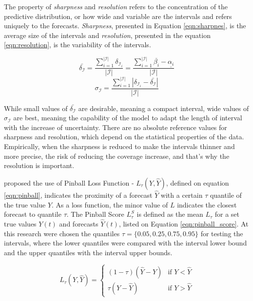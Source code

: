 The property of \textit{sharpness} and \textit{resolution} refers to the concentration of the predictive distribution, or how wide and variable are the intervals and refers uniquely to the forecasts. \textit{Sharpness}, presented in Equation \eqref{eqn:sharpnes}, is the average size of the intervals and \textit{resolution}, presented in the equation \eqref{eqn:resolution}, is the variability of the intervals.   

\begin{equation}
\bar{\delta_{\mathcal{I}}} = \frac{\sum_{i=1}^{|\mathcal{I}|} \delta_{\mathcal{I}_i}}{|\mathcal{I}|} =  \frac{\sum_{i=1}^{|\mathcal{I}|} \overline{\beta_i} - \underline{\alpha_i}}{|\mathcal{I}|}
\label{eqn:sharpnes}
\end{equation}
\begin{equation}
\sigma_{\mathcal{I}} = \frac{\sum_{i=1}^{|\mathcal{I}|} | \delta_{\mathcal{I}_i} - \bar{\delta_{\mathcal{I}}}|}{|\mathcal{I}|}
\label{eqn:resolution}
\end{equation}

While small values of $\bar{\delta_{\mathcal{I}}}$ are desirable, meaning a compact interval, wide values of $\sigma_{\mathcal{I}}$ are best, meaning the capability of the model to adapt the length of interval with the increase of uncertainty. There are no absolute reference values for sharpness and resolution, which depend on the statistical properties of the data. Empirically, when the sharpness is reduced to make the intervals thinner and more precise, the risk of reducing the coverage increase, and that's why the resolution is important. 


\cite{Steinwart2011} proposed the use of Pinball Loss Function - $L_\tau(Y,\hat{Y})$, defined on equation \ref{eqn:pinball}, indicates the proximity of a forecast $\hat{Y}$ with a certain $\tau$ quantile of the true value $Y$. As a loss function, the minor value of $L$ indicates the closest forecast to quantile $\tau$. The Pinball Score $L_\tau^S$ is defined as the mean $L_\tau$ for a set true values $Y(t)$ and forecasts $\hat{Y}(t)$, listed on Equation \ref{eqn:pinball_score}. At this research were chosen the quantiles $\tau = \{0.05, 0.25, 0.75, 0.95\}$ for testing the intervals, where the lower quantiles were compared with the interval lower bound and the upper quantiles with the interval upper bounds.

\begin{equation}
L_\tau(Y,\hat{Y}) = \left\{ \begin{array}{cl}
(1 - \tau)(\hat{Y}-Y) & \text{if } Y < \hat{Y} \\
\tau(Y-\hat{Y}) & \text{if }Y > \hat{Y}
\end{array} \right.
\label{eqn:pinball}
\end{equation}

